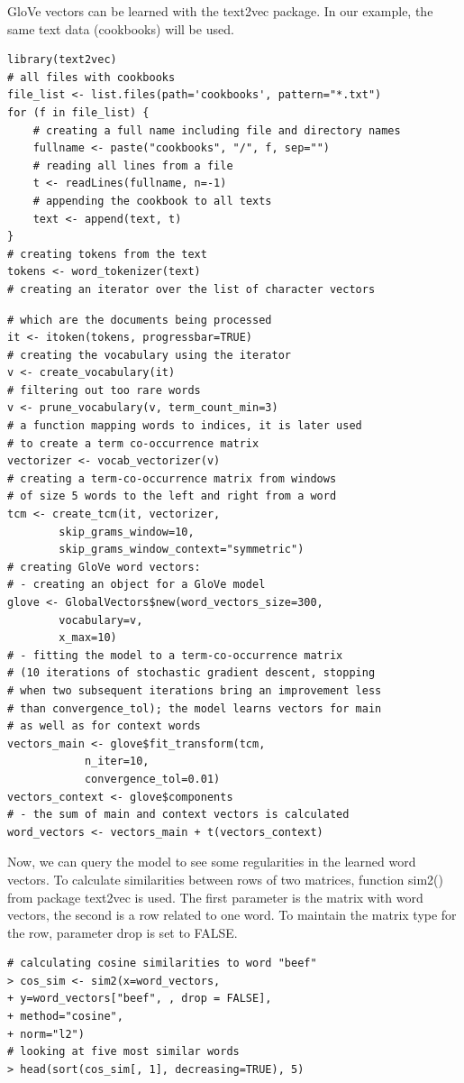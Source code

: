 \documentclass[10pt]{book}
\begin{document}
GloVe vectors can be learned with the text2vec package. In our example, the same text data (cookbooks) will be used.

\begin{verbatim}
library(text2vec)
# all files with cookbooks
file_list <- list.files(path='cookbooks', pattern="*.txt")
for (f in file_list) {
    # creating a full name including file and directory names
    fullname <- paste("cookbooks", "/", f, sep="")
    # reading all lines from a file
    t <- readLines(fullname, n=-1)
    # appending the cookbook to all texts
    text <- append(text, t)
}
# creating tokens from the text
tokens <- word_tokenizer(text)
# creating an iterator over the list of character vectors
\end{verbatim}

\begin{verbatim}
# which are the documents being processed
it <- itoken(tokens, progressbar=TRUE)
# creating the vocabulary using the iterator
v <- create_vocabulary(it)
# filtering out too rare words
v <- prune_vocabulary(v, term_count_min=3)
# a function mapping words to indices, it is later used
# to create a term co-occurrence matrix
vectorizer <- vocab_vectorizer(v)
# creating a term-co-occurrence matrix from windows
# of size 5 words to the left and right from a word
tcm <- create_tcm(it, vectorizer,
        skip_grams_window=10,
        skip_grams_window_context="symmetric")
# creating GloVe word vectors:
# - creating an object for a GloVe model
glove <- GlobalVectors$new(word_vectors_size=300,
        vocabulary=v,
        x_max=10)
# - fitting the model to a term-co-occurrence matrix
# (10 iterations of stochastic gradient descent, stopping
# when two subsequent iterations bring an improvement less
# than convergence_tol); the model learns vectors for main
# as well as for context words
vectors_main <- glove$fit_transform(tcm,
            n_iter=10,
            convergence_tol=0.01)
vectors_context <- glove$components
# - the sum of main and context vectors is calculated
word_vectors <- vectors_main + t(vectors_context)
\end{verbatim}

Now, we can query the model to see some regularities in the learned word vectors. To calculate similarities between rows of two matrices, function sim2() from package text2vec is used. The first parameter is the matrix with word vectors, the second is a row related to one word. To maintain the matrix type for the row, parameter drop is set to FALSE.

\begin{verbatim}
# calculating cosine similarities to word "beef"
> cos_sim <- sim2(x=word_vectors,
+ y=word_vectors["beef", , drop = FALSE],
+ method="cosine",
+ norm="l2")
# looking at five most similar words
> head(sort(cos_sim[, 1], decreasing=TRUE), 5)
\end{verbatim}
\end{document}
